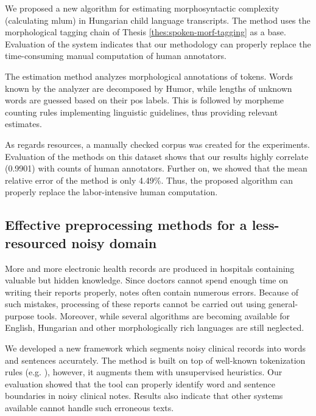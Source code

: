 \begin{core}
\begin{thesis}
\label{thes:mlu-estimation}
We proposed a new algorithm for estimating morphosyntactic complexity (calculating \acrlong{mlum}) in Hungarian child language transcripts.
The method uses the morphological tagging chain of Thesis \ref{thes:spoken-morf-tagging} as a base.
Evaluation of the system indicates that our methodology can properly replace the time-consuming manual computation of human annotators.
\end{thesis}

\begin{pub}
\cite{Matyus2014,Orosz2014c}
\end{pub}
\end{core}

The estimation method analyzes morphological annotations of tokens.
Words known by the analyzer are decomposed by Humor, while lengths of unknown words are guessed based on their \acrshort{pos} labels.
This is followed by morpheme counting rules implementing linguistic guidelines, thus providing relevant estimates.

As regards resources, a manually checked corpus was created for the experiments.
Evaluation of the methods on this dataset shows that our results highly correlate (0.9901) with counts of human annotators.
Further on, we showed that the mean relative error of the method is only 4.49\%.
Thus, the proposed algorithm can properly replace the labor-intensive human computation.

\subsection{Effective preprocessing methods for a less-resourced noisy domain}
\label{thes:clin}

More and more electronic health records are produced in hospitals containing valuable but hidden knowledge.
Since doctors cannot spend enough time on writing their reports properly, notes often contain numerous errors.
Because of such mistakes, processing of these reports cannot be carried out using general-purpose tools.
Moreover, while several algorithms are becoming available for English, Hungarian and other morphologically rich languages are still neglected.

\begin{core}
\begin{thesis}%
\label{thes:clin-segment}
We developed a new framework which segments noisy clinical records into words and sentences accurately.
The method is built on top of well-known tokenization rules (e.g. \cite{Halacsy2004}), however, it augments them with unsupervised heuristics.
Our evaluation showed that the tool can properly identify word and sentence boundaries in noisy clinical notes. 
Results also indicate that other systems available cannot handle such erroneous texts.
\end{thesis}

\begin{pub}
\cite{Orosz2013d,Orosz2014a,Orosz2014x}
\end{pub}
\end{core}

